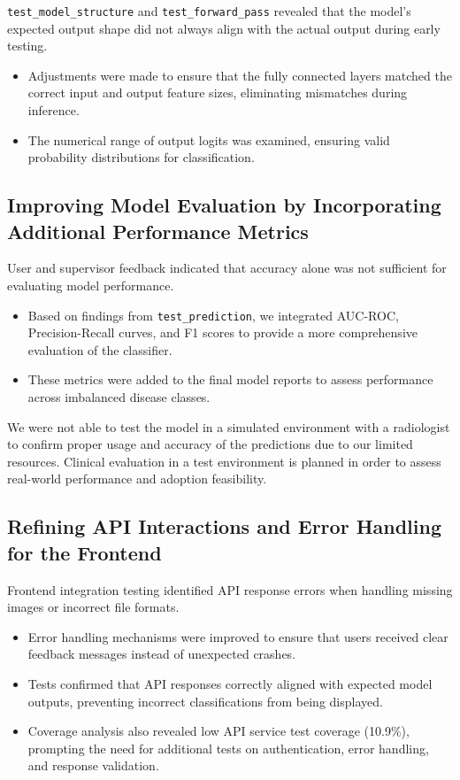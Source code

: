 \documentclass[12pt, titlepage]{article}
\begin{document}
\texttt{test\_model\_structure} and \texttt{test\_forward\_pass} revealed that the model's expected output shape did not always align with the actual output during early testing.
\begin{itemize}
    \item Adjustments were made to ensure that the fully connected layers matched the correct input and output feature sizes, eliminating mismatches during inference.
    \item The numerical range of output logits was examined, ensuring valid probability distributions for classification.
\end{itemize}

\subsection{Improving Model Evaluation by Incorporating Additional Performance Metrics}

User and supervisor feedback indicated that accuracy alone was not sufficient for evaluating model performance.
\begin{itemize}
    \item Based on findings from \texttt{test\_prediction}, we integrated AUC-ROC, Precision-Recall curves, and F1 scores to provide a more comprehensive evaluation of the classifier.
    \item These metrics were added to the final model reports to assess performance across imbalanced disease classes.
\end{itemize}

We were not able to test the model in a simulated environment with a radiologist to confirm proper usage and accuracy of the predictions due to our limited resources. Clinical evaluation in a test environment is planned in order to assess real-world performance and adoption feasibility.

\subsection{Refining API Interactions and Error Handling for the Frontend}

Frontend integration testing identified API response errors when handling missing images or incorrect file formats.
\begin{itemize}
    \item Error handling mechanisms were improved to ensure that users received clear feedback messages instead of unexpected crashes.
    \item Tests confirmed that API responses correctly aligned with expected model outputs, preventing incorrect classifications from being displayed.
    \item Coverage analysis also revealed low API service test coverage (10.9\%), prompting the need for additional tests on authentication, error handling, and response validation.
\end{itemize}
\end{document}

